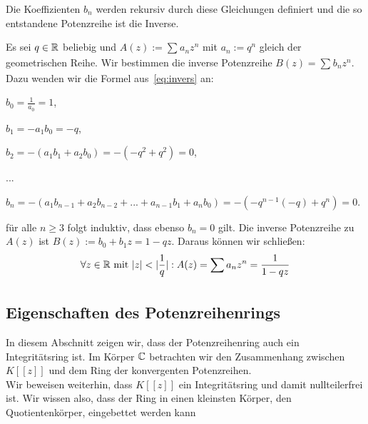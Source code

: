Die Koeffizienten $b_n$ werden rekursiv durch diese Gleichungen definiert und die so entstandene Potenzreihe ist die Inverse. 
%
\begin{bsp} %
Es sei $q \in \mathbb{R}$ beliebig und $A(z) := \sum_{}^{}a_n z^n$ mit $a_n := q^n$ gleich der geometrischen Reihe. Wir bestimmen die inverse Potenzreihe $B(z) = \sum_{}^{} b_n z^n$. Dazu wenden wir die Formel aus~\eqref{eq:invers} an:
\begin{center}
\begin{description}
\item $b_0 = \frac{1}{a_0} = 1$,
\item $b_1 = -a_1b_0 = -q$,
\item $b_2 = -\left(a_1b_1 + a_2b_0\right) = -\left(-q^2 + q^2\right) = 0$,
\item ...
\item $b_n = -\left(a_1b_{n-1} + a_2b_{n-2} + ... + a_{n-1}b_1 + a_nb_0\right) = -\left(-q^{n-1}(-q) + q^n\right) = 0$.
\end{description}
\end{center}
für alle $n \ge 3$ folgt induktiv, dass ebenso $b_n = 0$ gilt. Die inverse Potenzreihe zu $A(z)$ ist $B(z) := b_0 + b_1z = 1 - qz$. Daraus können wir schließen:
\[\forall z \in \mathbb{R} \text{ mit } |z| < |\frac{1}{q}|: A(z) = \sum_{}^{}a_n z^n = \frac{1}{1-qz}\] 
\end{bsp}
%
\subsection{Eigenschaften des Potenzreihenrings}
In diesem Abschnitt zeigen wir, dass der Potenzreihenring auch ein Integritätsring ist. Im Körper $\mathbb{C}$ betrachten wir den Zusammenhang zwischen $K[[z]]$ und dem Ring der konvergenten Potenzreihen. \\
Wir beweisen weiterhin, dass $K[[z]]$ ein Integritätsring und damit nullteilerfrei ist. Wir wissen also, dass der Ring in einen kleinsten Körper, den Quotientenkörper, eingebettet werden kann
%

